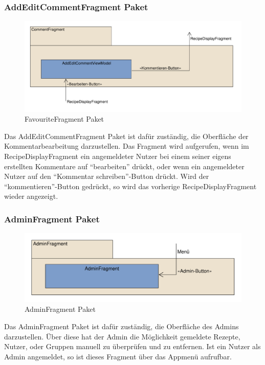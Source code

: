 \subsubsection{AddEditCommentFragment Paket}
\begin{figure}[H]
	\centering
	\includegraphics[width=\textwidth]{pics/viewPackages/CommentFragmentPaket.pdf}%
	\caption{FavouriteFragment Paket}%
	\label{view}%
\end{figure}
Das AddEditCommentFragment Paket ist dafür zuständig, die Oberfläche
der Kommentarbearbeitung darzustellen. Das Fragment wird aufgerufen, wenn im RecipeDisplayFragment ein angemeldeter Nutzer bei einem seiner eigens erstellten Kommentare auf "`bearbeiten"' drückt, oder wenn ein angemeldeter Nutzer auf den "`Kommentar schreiben"'-Button drückt. 
Wird der "`kommentieren"'-Button gedrückt, so wird das vorherige RecipeDisplayFragment wieder angezeigt.

\subsubsection{AdminFragment Paket}
\begin{figure}[H]
	\centering
	\includegraphics[width=\textwidth]{pics/viewPackages/AdminFragmentPaket.pdf}%
	\caption{AdminFragment Paket}%
	\label{view}%
\end{figure}
Das AdminFragment Paket ist dafür zuständig, die Oberfläche
des Admins darzustellen. Über diese hat der Admin die Möglichkeit gemeldete Rezepte, Nutzer, oder Gruppen manuell zu überprüfen und zu entfernen. Ist ein Nutzer als Admin angemeldet, so ist dieses Fragment über das Appmenü aufrufbar.


